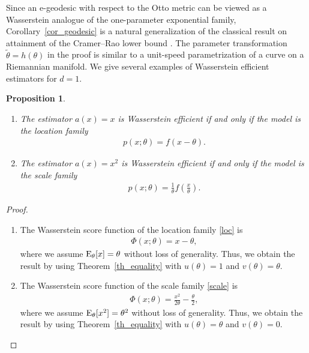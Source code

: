 \documentclass[11pt, a4paper]{article}
\newtheorem{proposition}{Proposition}
\begin{document}
Since an e-geodesic with respect to the Otto metric can be viewed as a Wasserstein analogue of the one-parameter exponential family, Corollary~\ref{cor_geodesic} is a natural generalization of the classical result on attainment of the Cramer--Rao lower bound \cite{Fisher_efficiency,Fisher_efficiency2}.
The parameter transformation $\widetilde{\theta}=h(\theta)$ in the proof is similar to a unit-speed parametrization of a curve on a Riemannian manifold.
We give several examples of Wasserstein efficient estimators for $d=1$.

\begin{proposition}
	\begin{enumerate}
		\item The estimator $a(x) = x$ is Wasserstein efficient if and only if the model is the location family 
		\begin{align}
			p(x; \theta) = f(x-\theta). \label{loc}
		\end{align}
		
		\item The estimator $a(x) = x^2$ is Wasserstein efficient if and only if the model is the scale family
		\begin{align}
			p(x; \theta) = \frac{1}{\theta} f \left( \frac{x}{\theta} \right). \label{scale}
		\end{align}
	\end{enumerate}
\end{proposition}
\begin{proof}
	\begin{enumerate}
		\item The Wasserstein score function of the location family \eqref{loc} is
		\begin{align*}
			\Phi(x; \theta) = x-\theta,
		\end{align*}
		where we assume ${\rm E}_{\theta}[x] = \theta$ without loss of generality.
		Thus, we obtain the result by using Theorem~\ref{th_equality} with $u(\theta)=1$ and $v(\theta)=\theta$.
		
		\item The Wasserstein score function of the scale family \eqref{scale} is
		\begin{align*}
			\Phi(x; \theta) = \frac{x^2}{2 \theta} - \frac{\theta}{2},
		\end{align*}
		where we assume ${\rm E}_{\theta}[x^2] = \theta^2$ without loss of generality.
		Thus, we obtain the result by using Theorem~\ref{th_equality} with $u(\theta)=\theta$ and $v(\theta)=0$.
	\end{enumerate}
\end{proof}
\end{document}
